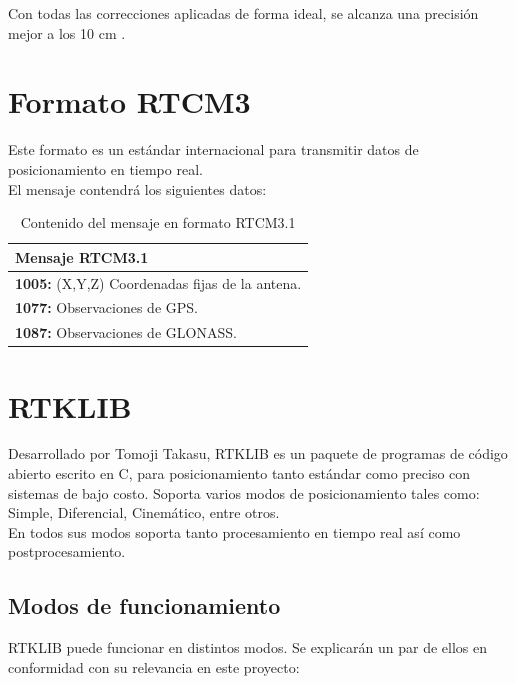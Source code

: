 Con todas las correcciones aplicadas de forma ideal, se alcanza una precisión mejor a los 10 cm \cite{cerrato2011diseno}.

\section{Formato RTCM3}

Este formato es un estándar internacional para transmitir datos de posicionamiento en tiempo real. \\

El mensaje contendrá los siguientes datos: \\

\begin{table}[!htb]
\begin{center}
\caption{Contenido del mensaje en formato RTCM3.1}
\begin{tabular}{|l|}
	\hline
	\textbf{Mensaje RTCM3.1}\\
	\hline
	\tabitem \textbf{1005:} (X,Y,Z) Coordenadas fijas de la antena. \\
	\tabitem \textbf{1077:} Observaciones de GPS. \\
	\tabitem \textbf{1087:} Observaciones de GLONASS.\footnotemark \\
	\hline
\end{tabular}
\end{center}
\end{table}


\section{RTKLIB}

Desarrollado por Tomoji Takasu, RTKLIB es un paquete de programas de código abierto escrito en C, para posicionamiento tanto estándar como preciso con sistemas de bajo costo. Soporta varios modos de posicionamiento tales como: Simple, Diferencial, Cinemático, entre otros. \\

En todos sus modos soporta tanto procesamiento en tiempo real así como postprocesamiento\cite{takasu2009development}.

\subsection{Modos de funcionamiento}

RTKLIB puede funcionar en distintos modos. Se explicarán un par de ellos en conformidad con su relevancia en este proyecto:


